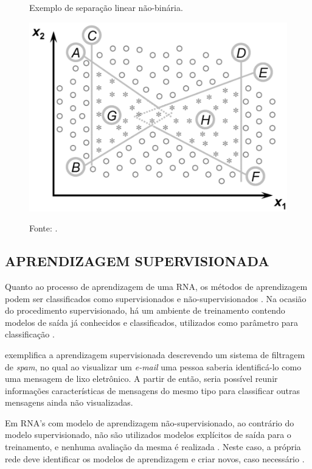 \begin{figure}[h]
	\caption{Exemplo de separação linear não-binária.}
	\caption*{Fonte: .}
	\centering %
	\includegraphics[width=12cm]{resources/multilayer_perceptron.png} %
	\label{figura:multilayer_perceptron}	
\end{figure}

\newpage

\subsection{APRENDIZAGEM SUPERVISIONADA}

Quanto ao processo de aprendizagem de uma RNA, os métodos de aprendizagem podem ser classificados como supervisionados e não-supervisionados \cite{haykin2007redes}. Na ocasião do procedimento supervisionado, há um ambiente de treinamento contendo modelos de saída já conhecidos e classificados, utilizados como parâmetro para classificação \cite{marius2009}.

 exemplifica a aprendizagem supervisionada descrevendo um sistema de filtragem de \textit{spam}, no qual ao visualizar um \textit{e-mail} uma pessoa saberia identificá-lo como uma mensagem de lixo eletrônico. A partir de então, seria possível reunir informações características de mensagens do mesmo tipo para classificar outras mensagens ainda não visualizadas.

Em RNA's com modelo de aprendizagem não-supervisionado, ao contrário do modelo supervisionado, não são utilizados modelos explícitos de saída para o treinamento, e nenhuma avaliação da mesma é realizada \cite{von2005rede}. Neste caso, a própria rede deve identificar os modelos de aprendizagem e criar novos, caso necessário \cite{becker1991}.

